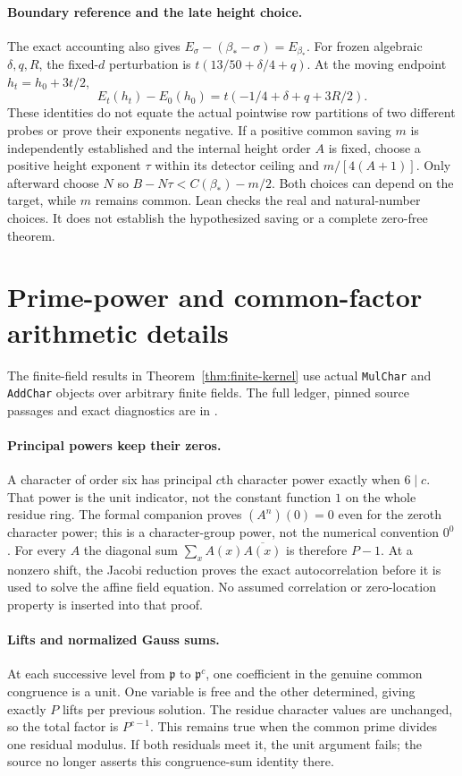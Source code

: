 \paragraph{Boundary reference and the late height choice.}
The exact accounting also gives
$E_\sigma-(\beta_*-\sigma)=E_{\beta_*}$.
For frozen algebraic $\delta,q,R$, the fixed-$d$ perturbation is
$t(13/50+\delta/4+q)$. At the moving endpoint $h_t=h_0+3t/2$,
\[
 E_t(h_t)-E_0(h_0)=t(-1/4+\delta+q+3R/2).
\]
These identities do not equate the actual pointwise row partitions of
two different probes or prove their exponents negative.
If a positive common saving $m$ is independently established and the
internal height order $A$ is fixed, choose a positive height exponent
$\tau$ within its detector ceiling and $m/[4(A+1)]$. Only afterward
choose $N$ so $B-N\tau<C(\beta_*)-m/2$.
Both choices can depend on the target, while $m$ remains common.
Lean checks the real and natural-number choices. It does not establish
the hypothesized saving or a complete zero-free theorem.


\section{Prime-power and common-factor arithmetic details}
The finite-field results in Theorem~\ref{thm:finite-kernel} use actual
\texttt{MulChar} and \texttt{AddChar} objects over arbitrary finite fields.
The full ledger, pinned source passages and exact diagnostics are in
.

\paragraph{Principal powers keep their zeros.}
A character of order six has principal $c$th character power exactly
when $6\mid c$. That power is the unit indicator, not the constant
function $1$ on the whole residue ring. The formal companion proves
$(A^n)(0)=0$ even for the zeroth character power; this is a character-group
power, not the numerical convention $0^0$. For every $A$ the diagonal
sum $\sum_xA(x)\overline{A(x)}$ is therefore $P-1$.
At a nonzero shift, the Jacobi reduction proves the exact autocorrelation
before it is used to solve the affine field equation. No assumed
correlation or zero-location property is inserted into that proof.

\paragraph{Lifts and normalized Gauss sums.}
At each successive level from $\mathfrak p$ to $\mathfrak p^c$, one
coefficient in the genuine common congruence is a unit. One variable is
free and the other determined, giving exactly $P$ lifts per previous
solution. The residue character values are unchanged, so the total
factor is $P^{c-1}$. This remains true when the common prime divides
one residual modulus. If both residuals meet it, the unit argument
fails; the source no longer asserts this congruence-sum identity there.

